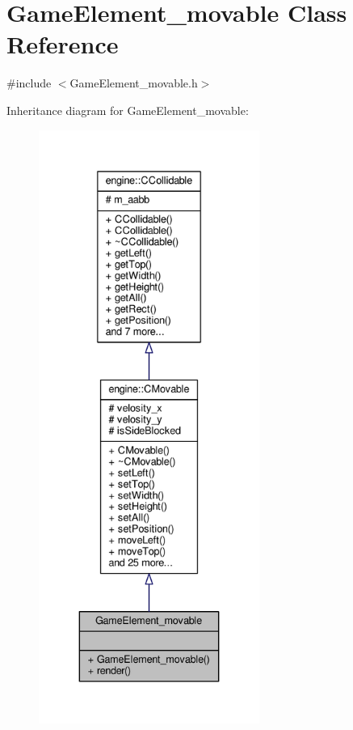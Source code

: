 \hypertarget{classGameElement__movable}{\section{Game\-Element\-\_\-movable Class Reference}
\label{classGameElement__movable}
}


{\ttfamily \#include $<$Game\-Element\-\_\-movable.\-h$>$}



Inheritance diagram for Game\-Element\-\_\-movable\-:\nopagebreak
\begin{figure}[H]
\begin{center}
\leavevmode
\includegraphics[height=550pt]{classGameElement__movable__inherit__graph}
\end{center}
\end{figure}



